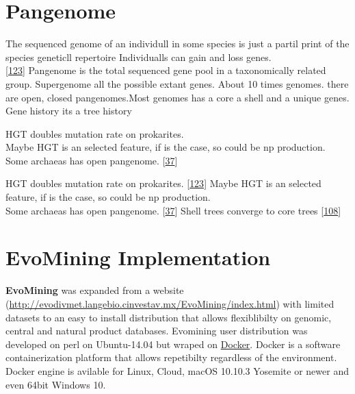 \documentclass[12pt,twoside]{reedthesis}
\begin{document}
  \section{Pangenome}\label{pangenome}
  
  The sequenced genome of an individull in some species is just a partil
  print of the species geneticll repertoire Individualls can gain and loss
  genes.\\
  {[}\protect\hyperlink{ref-kooninux5fturbulentux5f2015}{123}{]} Pangenome
  is the total sequenced gene pool in a taxonomically related group.
  Supergenome all the possible extant genes. About 10 times genomes. there
  are open, closed pangenomes.Most genomes has a core a shell and a unique
  genes.\\
  Gene history its a tree history
  
  HGT doubles mutation rate on prokarites.\\
  Maybe HGT is an selected feature, if is the case, so could be np
  production.\\
  Some archaeas has open pangenome.
  {[}\protect\hyperlink{ref-halachevux5fcalculatingux5f2011}{37}{]}
  
  HGT doubles mutation rate on prokarites.
  {[}\protect\hyperlink{ref-kooninux5fturbulentux5f2015}{123}{]} Maybe HGT
  is an selected feature, if is the case, so could be np production.\\
  Some archaeas has open pangenome.
  {[}\protect\hyperlink{ref-halachevux5fcalculatingux5f2011}{37}{]} Shell
  trees converge to core trees
  {[}\protect\hyperlink{ref-narechaniaux5frandomux5f2012}{108}{]}
  
  \section{EvoMining Implementation}\label{evomining-implementation}
  
  \textbf{EvoMining} was expanded from a website
  (\url{http://evodivmet.langebio.cinvestav.mx/EvoMining/index.html}) with
  limited datasets to an easy to install distribution that allows
  flexiblibilty on genomic, central and natural product databases.
  Evomining user distribution was developed on perl on Ubuntu-14.04 but
  wraped on \href{https://www.docker.com/}{Docker}. Docker is a software
  containerization platform that allows repetibilty regardless of the
  environment. Docker engine is avilable for Linux, Cloud, macOS 10.10.3
  Yosemite or newer and even 64bit Windows 10.
  
\end{document}
